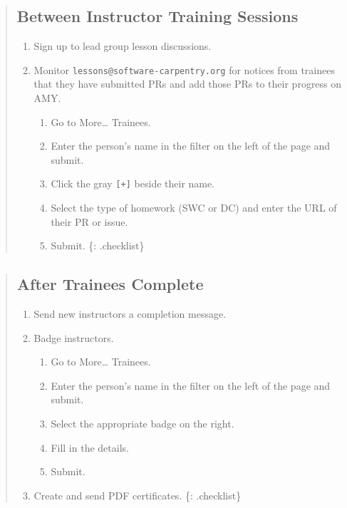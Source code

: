 \begin{quote}
\subsection{Between Instructor Training
Sessions}\label{between-instructor-training-sessions}

\begin{enumerate}
\item
  Sign up to lead group lesson discussions.
\item
  Monitor \texttt{lessons@software-carpentry.org} for notices from
  trainees that they have submitted PRs and add those PRs to their
  progress on AMY.

  \begin{enumerate}
    \item
    Go to More\ldots{} Trainees.
  \item
    Enter the person's name in the filter on the left of the page and
    submit.
  \item
    Click the gray \texttt{{[}+{]}} beside their name.
  \item
    Select the type of homework (SWC or DC) and enter the URL of their
    PR or issue.
  \item
    Submit. \{: .checklist\}
  \end{enumerate}
\end{enumerate}
\end{quote}

\begin{quote}
\subsection{After Trainees Complete}\label{after-trainees-complete}

\begin{enumerate}
\item
  Send new instructors
  a completion message.
\item
  Badge instructors.

  \begin{enumerate}
    \item
    Go to More\ldots{} Trainees.
  \item
    Enter the person's name in the filter on the left of the page and
    submit.
  \item
    Select the appropriate badge on the right.
  \item
    Fill in the details.
  \item
    Submit.
  \end{enumerate}
\item
  Create and send PDF certificates. \{: .checklist\}
\end{enumerate}
\end{quote}

